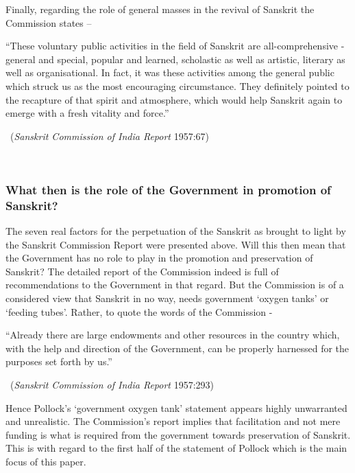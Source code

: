Finally, regarding the role of general masses in the revival of Sanskrit the Commission states – 
\begin{myquote}
\eleven
“These voluntary public activities in the field of Sanskrit are all-comprehensive - general and special, popular and learned, scholastic as well as artistic, literary as well as organisational. In fact, it was these activities among the general public which struck us as the most encouraging circumstance. They definitely pointed to the recapture of that spirit and atmosphere, which would help Sanskrit again to emerge with a fresh vitality and force.”
\vskip -5pt

~\hfill ({\sl Sanskrit Commission of India Report} 1957:67)
\end{myquote}

~\\[-40pt]

\subsubsection{What then is the role of the Government in promotion of Sanskrit?}
\vskip -5pt

The seven real factors for the perpetuation of the Sanskrit as brought to light by the Sanskrit Commission Report were presented above. Will this then mean that the Government has no role to play in the promotion and preservation of Sanskrit?  The detailed report of the Commission indeed is full of recommendations to the Government in that regard. But the Commission is of a considered view that Sanskrit in no way, needs government ‘oxygen tanks’ or ‘feeding tubes’. Rather, to quote the words of the Commission -
\begin{myquote}
\eleven
“Already there are large endowments and other resources in the country which, with the help and direction of the Government, can be properly harnessed for the purposes set forth by us.” 
\vskip -5pt

~\hfill({\sl Sanskrit Commission of India Report} 1957:293)
\end{myquote}

Hence Pollock’s ‘government oxygen tank’ statement appears highly unwarranted and unrealistic. The Commission’s report implies that facilitation and not mere funding is what is required from the government towards preservation of Sanskrit. This is with regard to the first half of the statement of Pollock which is the main focus of this paper.   

